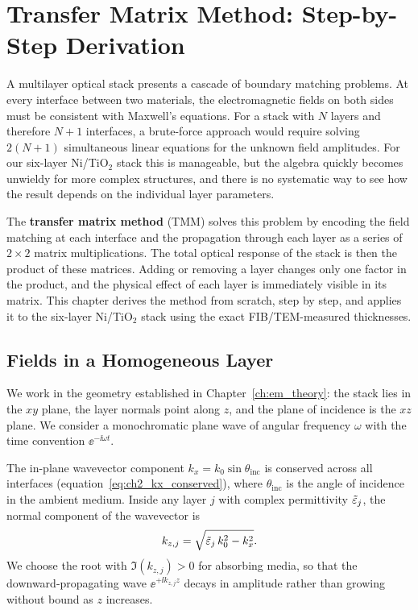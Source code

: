 
\chapter{Transfer Matrix Method: Step-by-Step Derivation}
\label{ch:tmm_derivation}

A multilayer optical stack presents a cascade of boundary matching problems.
At every interface between two materials, the electromagnetic fields on both
sides must be consistent with Maxwell's equations. For a stack with $N$ layers
and therefore $N+1$ interfaces, a brute-force approach would require solving
$2(N+1)$ simultaneous linear equations for the unknown field amplitudes. For
our six-layer Ni/TiO$_2$ stack this is manageable, but the algebra quickly
becomes unwieldy for more complex structures, and there is no systematic way
to see how the result depends on the individual layer parameters.

The \textbf{transfer matrix method} (TMM) solves this problem by encoding the
field matching at each interface and the propagation through each layer as a
series of $2\times 2$ matrix multiplications. The total optical response of the
stack is then the product of these matrices. Adding or removing a layer changes
only one factor in the product, and the physical effect of each layer is
immediately visible in its matrix. This chapter derives the method from
scratch, step by step, and applies it to the six-layer Ni/TiO$_2$ stack using
the exact FIB/TEM-measured thicknesses.

\section{Fields in a Homogeneous Layer}

We work in the geometry established in Chapter~\ref{ch:em_theory}: the stack
lies in the $xy$ plane, the layer normals point along $z$, and the plane of
incidence is the $xz$ plane. We consider a monochromatic plane wave of angular
frequency $\omega$ with the time convention $\ee^{-\ii\omega t}$.

The in-plane wavevector component $k_x = k_0\sin\theta_\text{inc}$ is
conserved across all interfaces (equation~\eqref{eq:ch2_kx_conserved}), where
$\theta_\text{inc}$ is the angle of incidence in the ambient medium. Inside any
layer $j$ with complex permittivity $\tilde{\varepsilon}_j$, the normal component of the
wavevector is
\begin{equation}
  k_{z,j} = \sqrt{\tilde{\varepsilon}_j\,k_0^2 - k_x^2}.
  \label{eq:ch5_kz_isotropic}
\end{equation}
We choose the root with $\Im(k_{z,j}) > 0$ for absorbing media, so that the
downward-propagating wave $\ee^{+\ii k_{z,j} z}$ decays in amplitude rather than
growing without bound as $z$ increases.

